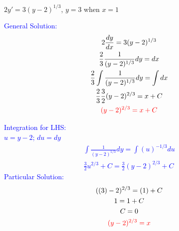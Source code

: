 \item $2y' = 3(y - 2)^{1/3}$, $y=3$ when $x=1$

\textcolor{blue}{
    \begin{minipage}[t]{0.45\textwidth}
        General Solution:
        \begin{gather*}
            2\frac{dy}{dx} = 3(y - 2)^{1/3}\\
            \frac{2}{3}\frac{1}{(y - 2)^{1/3}}dy =dx\\
            \frac{2}{3}\int\frac{1}{(y - 2)^{1/3}}dy=\int dx\\
            \frac{2}{3}\frac{3}{2}(y-2)^{2/3}=x+C\\
            \textcolor{red}{
            (y-2)^{2/3}=x+C
            }
        \end{gather*}
    \end{minipage}
    \hfill
    \begin{minipage}[t]{0.45\textwidth}
        Integration for LHS:\\
        $u=y-2$; $du=dy$
        \begin{gather*}
            \int\frac{1}{(y - 2)^{1/3}}dy=\int(u)^{-1/3}du\\
            \frac{3}{2}u^{2/3}+C=\frac{3}{2}(y-2)^{2/3}+C
        \end{gather*}
        Particular Solution:
        \begin{gather*}
            ((3)-2)^{2/3}=(1)+C\\
            1=1+C\\
            C=0\\
            \textcolor{red}{
                (y-2)^{2/3}=x
            }
        \end{gather*}
    \end{minipage}
}